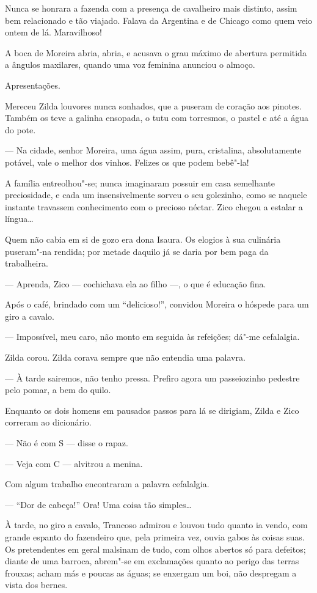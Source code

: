 Nunca se honrara a fazenda com a presença de cavalheiro mais distinto,
assim bem relacionado e tão viajado. Falava da Argentina e de Chicago
como quem veio ontem de lá. Maravilhoso!

A boca de Moreira abria, abria, e acusava o grau máximo de abertura
permitida a ângulos maxilares, quando uma voz feminina anunciou o
almoço.

Apresentações.

Mereceu Zilda louvores nunca sonhados, que a puseram de coração aos
pinotes. Também os teve a galinha ensopada, o tutu com torresmos, o
pastel e até a água do pote.

--- Na cidade, senhor Moreira, uma água assim, pura, cristalina,
absolutamente potável, vale o melhor dos vinhos. Felizes os que podem
bebê"-la!

A família entreolhou"-se; nunca imaginaram possuir em casa semelhante
preciosidade, e cada um insensivelmente sorveu o seu golezinho, como se
naquele instante travassem conhecimento com o precioso néctar. Zico
chegou a estalar a língua\ldots{}

Quem não cabia em si de gozo era dona Isaura. Os elogios à sua culinária
puseram"-na rendida; por metade daquilo já se daria por bem paga da
trabalheira.

--- Aprenda, Zico --- cochichava ela ao filho ---, o que é educação
fina.

Após o café, brindado com um ``delicioso!'', convidou Moreira o hóspede
para um giro a cavalo.

--- Impossível, meu caro, não monto em seguida às refeições; dá"-me
cefalalgia.

Zilda corou. Zilda corava sempre que não entendia uma palavra.

--- À tarde sairemos, não tenho pressa. Prefiro agora um passeiozinho
pedestre pelo pomar, a bem do quilo.

Enquanto os dois homens em pausados passos para lá se dirigiam, Zilda e
Zico correram ao dicionário.

--- Não é com S --- disse o rapaz.

--- Veja com C --- alvitrou a menina.

Com algum trabalho encontraram a palavra cefalalgia.

--- ``Dor de cabeça!'' Ora! Uma coisa tão simples\ldots{}

À tarde, no giro a cavalo, Trancoso admirou e louvou tudo quanto ia
vendo, com grande espanto do fazendeiro que, pela primeira vez, ouvia
gabos às coisas suas. Os pretendentes em geral malsinam de tudo, com
olhos abertos só para defeitos; diante de uma barroca, abrem"-se em
exclamações quanto ao perigo das terras frouxas; acham más e poucas as
águas; se enxergam um boi, não despregam a vista dos bernes.

